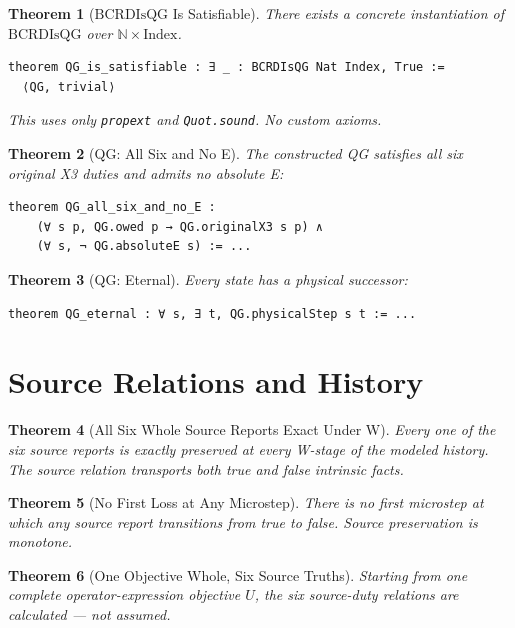 \documentclass[11pt,a4paper]{article}
\newtheorem{theorem}{Theorem}[section]
\theoremstyle{definition}
\theoremstyle{remark}
\newcommand{\BCRD}{\mathrm{BCRD}}
\begin{document}
\begin{theorem}[$\BCRD\text{IsQG}$ Is Satisfiable]
\label{thm:qg-satisfiable}
There exists a concrete instantiation of $\BCRD\text{IsQG}$ over $\mathbb{N} \times \text{Index}$.
\begin{lstlisting}
theorem QG_is_satisfiable : ∃ _ : BCRDIsQG Nat Index, True :=
  ⟨QG, trivial⟩
\end{lstlisting}
This uses only \texttt{propext} and \texttt{Quot.sound}. No custom axioms.
\end{theorem}

\begin{theorem}[QG: All Six and No E]
\label{thm:qg-all-six}
The constructed QG satisfies all six original X3 duties and admits no absolute E:
\begin{lstlisting}
theorem QG_all_six_and_no_E :
    (∀ s p, QG.owed p → QG.originalX3 s p) ∧
    (∀ s, ¬ QG.absoluteE s) := ...
\end{lstlisting}
\end{theorem}

\begin{theorem}[QG: Eternal]
Every state has a physical successor:
\begin{lstlisting}
theorem QG_eternal : ∀ s, ∃ t, QG.physicalStep s t := ...
\end{lstlisting}
\end{theorem}

\section{Source Relations and History}

\begin{theorem}[All Six Whole Source Reports Exact Under W]
Every one of the six source reports is exactly preserved at every W-stage of the modeled history. The source relation transports both true and false intrinsic facts.
\end{theorem}

\begin{theorem}[No First Loss at Any Microstep]
There is no first microstep at which any source report transitions from true to false. Source preservation is monotone.
\end{theorem}

\begin{theorem}[One Objective Whole, Six Source Truths]
Starting from one complete operator-expression objective $U$, the six source-duty relations are calculated --- not assumed.
\end{theorem}
\end{document}
